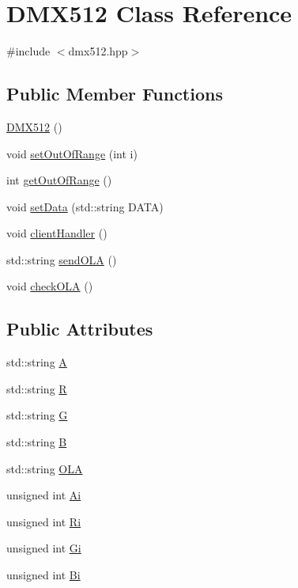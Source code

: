 \hypertarget{classDMX512}{}\section{D\+M\+X512 Class Reference}
\label{classDMX512}


{\ttfamily \#include $<$dmx512.\+hpp$>$}

\subsection*{Public Member Functions}
\begin{DoxyCompactItemize}
\item 
\hyperlink{classDMX512_a20a4e33b35609a6e1ac54b5812f6704b}{D\+M\+X512} ()
\item 
void \hyperlink{classDMX512_ad392198ed2202ea28a78764ba1d9c453}{set\+Out\+Of\+Range} (int i)
\item 
int \hyperlink{classDMX512_aebc0e33cf9e594124b3a48f86bd6a95c}{get\+Out\+Of\+Range} ()
\item 
void \hyperlink{classDMX512_af7b430f6b8c50ad34773c2f83eaa3db9}{set\+Data} (std\+::string D\+A\+TA)
\item 
void \hyperlink{classDMX512_a6ae50e79301e42784934bf853c945b45}{client\+Handler} ()
\item 
std\+::string \hyperlink{classDMX512_adb00c53d6367188e848fea660d31da28}{send\+O\+LA} ()
\item 
void \hyperlink{classDMX512_a12731a1553eed443a1ebbc6aa7e92864}{check\+O\+LA} ()
\end{DoxyCompactItemize}
\subsection*{Public Attributes}
\begin{DoxyCompactItemize}
\item 
std\+::string \hyperlink{classDMX512_a51cddf44923b3cd81ad448b461315c1d}{A}
\item 
std\+::string \hyperlink{classDMX512_a231a85f100b6b81a202143d858ed26d1}{R}
\item 
std\+::string \hyperlink{classDMX512_ae7d4142513f8c3978c93f39bf5c1c599}{G}
\item 
std\+::string \hyperlink{classDMX512_af3306a5965828c8eb012e2d570f7614e}{B}
\item 
std\+::string \hyperlink{classDMX512_a266eca0f1d1836e8122edd5efeae3c84}{O\+LA}
\item 
unsigned int \hyperlink{classDMX512_ae450756118a5e3d1173fd564deeb11c3}{Ai}
\item 
unsigned int \hyperlink{classDMX512_aa5ffc37b24d0a79180d13663a5cf8379}{Ri}
\item 
unsigned int \hyperlink{classDMX512_afa6a4f81386fd8c8fc86a156fc7018e1}{Gi}
\item 
unsigned int \hyperlink{classDMX512_a8f4300cb289c94e708314c1bb3078ca8}{Bi}
\end{DoxyCompactItemize}


